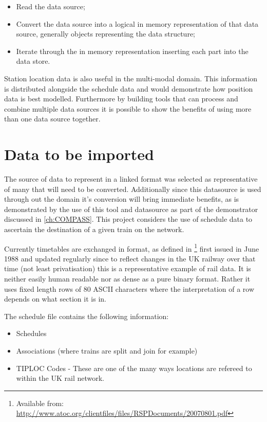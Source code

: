  \begin{itemize}
	\item Read the data source;
	\item Convert the data source into a logical in memory representation of that data source, generally objects representing the data structure;
	\item Iterate through the in memory representation inserting each part into the data store.
\end{itemize}


Station location data is also useful in the multi-modal domain. This information is distributed alongside the schedule data and would demonstrate how position data is best modelled. Furthermore by building tools that can process and combine multiple data sources it is possible to show the benefits of using more than one data source together. 
\section{Data to be imported}
\label{sec:datatoimport}
The source of data to represent in a linked format was selected as representative of many that will need to be converted. Additionally since this datasource is used through out the domain it's conversion will bring immediate benefits, as is demonstrated by the use of this tool and datasource as part of the demonstrator discussed in \autoref{ch:COMPASS}. This project considers the use of schedule data to ascertain the destination of a given train on the network.

Currently timetables are exchanged in  format, as defined in \citep{nr2007}\footnote{Available from: \url{http://www.atoc.org/clientfiles/files/RSPDocuments/20070801.pdf}} first issued in June 1988 and updated regularly since to reflect changes in the UK railway over that time (not least privatisation) this is a representative example of rail data. It is neither easily human readable nor as dense as a pure binary format. Rather it uses fixed length rows of 80 ASCII characters where the interpretation of a row depends on what section it is in.

The schedule file contains the following information:
\begin{itemize}
	\item Schedules
	\item Associations (where trains are split and join for example)
	\item TIPLOC Codes - These are one of the many ways locations are refereed to within the  UK rail network.
\end{itemize}

